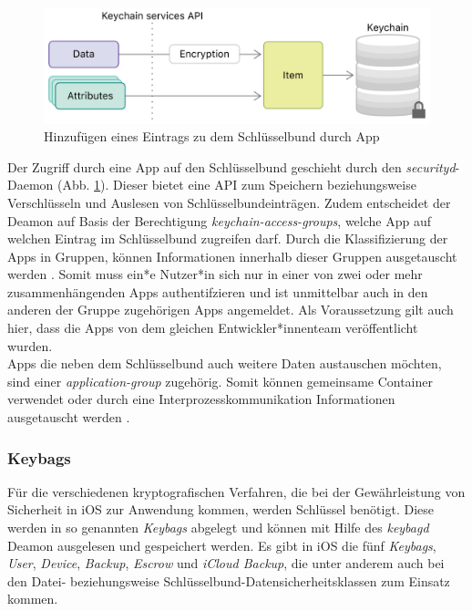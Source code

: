 \begin{figure}[h]
	\centering
  		\includegraphics[width=1\textwidth]{../images/keychain-api-example}
		\caption{Hinzufügen eines Eintrags zu dem Schlüsselbund durch App \cite{apple2020keychain_items}}
		\label{fig:add-entry-to-keychain}
\end{figure}

Der Zugriff durch eine App auf den Schlüsselbund geschieht durch den \textit{securityd}-Daemon (Abb. \ref{fig:add-entry-to-keychain}). Dieser bietet eine API zum Speichern beziehungsweise Verschlüsseln und Auslesen von Schlüsselbundeinträgen. Zudem  entscheidet der Deamon auf Basis der Berechtigung \textit{keychain-access-groups}, welche App auf welchen Eintrag im Schlüsselbund zugreifen darf. Durch die Klassifizierung der Apps in Gruppen, können Informationen innerhalb dieser Gruppen ausgetauscht werden \cite{apple2020keychain_item_groups}. Somit muss ein*e Nutzer*in sich nur in einer von zwei oder mehr zusammenhängenden Apps authentifzieren und ist unmittelbar auch in den anderen der Gruppe zugehörigen Apps angemeldet. Als Voraussetzung gilt auch hier, dass die Apps von dem gleichen Entwickler*innenteam veröffentlicht wurden. \\
Apps die neben dem Schlüsselbund auch weitere Daten austauschen möchten, sind einer \textit{application-group} zugehörig.  Somit können gemeinsame Container verwendet oder durch eine Interprozesskommunikation Informationen ausgetauscht werden \cite{apple2020keychain_application_groups}. 


\subsubsection{Keybags}
Für die verschiedenen kryptografischen Verfahren, die bei der Gewährleistung von Sicherheit in iOS zur Anwendung kommen, werden Schlüssel benötigt. Diese werden in so genannten \textit{Keybags} abgelegt und können mit Hilfe des \textit{keybagd} Deamon ausgelesen und gespeichert werden.
Es gibt in iOS die fünf \textit{Keybags}, \textit{User}, \textit{Device}, \textit{Backup}, \textit{Escrow} und \textit{iCloud Backup}, die unter anderem auch bei den Datei- beziehungsweise  Schlüsselbund-Datensicherheitsklassen  zum Einsatz kommen.\cite{apple2020}

